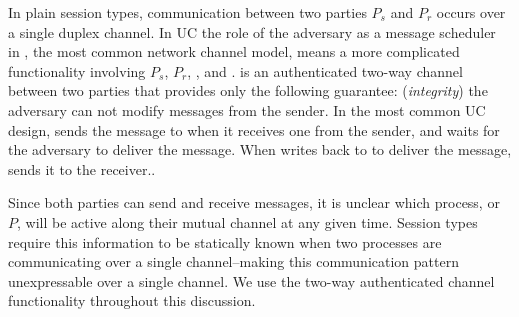 In plain session types, communication between two parties $P_s$ and $P_r$ occurs over a single duplex channel.
In UC the role of the adversary as a message scheduler in \Fauth, the most common network channel model, means a more complicated functionality involving $P_s$, $P_r$, \F, and \A. 
\Fauth is an authenticated two-way channel between two parties that provides only the following guarantee: (\emph{integrity}) the adversary can not modify messages from the sender.
In the most common UC design, \Fauth sends the message to \A when it receives one from the sender, and waits for the adversary to deliver the message.
When \A writes back to \Fauth to deliver the message, \Fauth sends it to the receiver..

Since both parties can send and receive messages, it is unclear which process, \Fauth or $P$, will be active along their mutual channel at any given time.
Session types require this information to be statically known when two processes are communicating over a single channel--making this communication pattern unexpressable over a single channel.
We use the two-way authenticated channel functionality \Fauth throughout this discussion.

